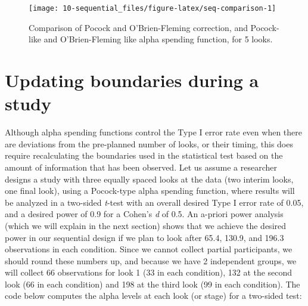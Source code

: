 \documentclass[
  oneside]{book}
\newenvironment{Shaded}{\begin{snugshade}}{\end{snugshade}}
\newcommand{\AttributeTok}[1]{\textcolor[rgb]{0.77,0.63,0.00}{#1}}
\newcommand{\DecValTok}[1]{\textcolor[rgb]{0.00,0.00,0.81}{#1}}
\newcommand{\FloatTok}[1]{\textcolor[rgb]{0.00,0.00,0.81}{#1}}
\newcommand{\FunctionTok}[1]{\textcolor[rgb]{0.00,0.00,0.00}{#1}}
\newcommand{\NormalTok}[1]{#1}
\newcommand{\OtherTok}[1]{\textcolor[rgb]{0.56,0.35,0.01}{#1}}
\newcommand{\SpecialCharTok}[1]{\textcolor[rgb]{0.00,0.00,0.00}{#1}}
\newcommand{\StringTok}[1]{\textcolor[rgb]{0.31,0.60,0.02}{#1}}
\begin{document}
\begin{figure}

{\centering \texttt{[image: 10-sequential\_files/figure-latex/seq-comparison-1]} 

}

\caption{Comparison of Pocock and O'Brien-Fleming correction, and Pocock-like and O'Brien-Fleming like alpha spending function, for 5 looks.}\label{fig:seq-comparison}
\end{figure}

\hypertarget{updating-boundaries-during-a-study}{%
\section{Updating boundaries during a study}\label{updating-boundaries-during-a-study}}

Although alpha spending functions control the Type I error rate even when there are deviations from the pre-planned number of looks, or their timing, this does require recalculating the boundaries used in the statistical test based on the amount of information that has been observed. Let us assume a researcher designs a study with three equally spaced looks at the data (two interim looks, one final look), using a Pocock-type alpha spending function, where results will be analyzed in a two-sided \emph{t}-test with an overall desired Type I error rate of 0.05, and a desired power of 0.9 for a Cohen's \emph{d} of 0.5. An a-priori power analysis (which we will explain in the next section) shows that we achieve the desired power in our sequential design if we plan to look after 65.4, 130.9, and 196.3 observations in each condition. Since we cannot collect partial participants, we should round these numbers up, and because we have 2 independent groups, we will collect 66 observations for look 1 (33 in each condition), 132 at the second look (66 in each condition) and 198 at the third look (99 in each condition). The code below computes the alpha levels at each look (or stage) for a two-sided test:

\begin{Shaded}
\end{Shaded}
\end{document}
